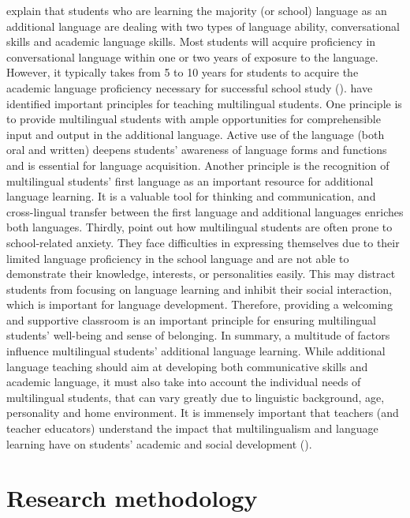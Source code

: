 \documentclass[output=paper]{langscibook}
\begin{document}
\citet{CumminsEarly2015} explain that students who are learning the majority (or school) language as an additional language are dealing with two types of language ability, conversational skills and academic language skills. Most students will acquire proficiency in conversational language within one or two years of exposure to the language. However, it typically takes from 5 to 10 years for students to acquire the academic language proficiency necessary for successful school study (\citealt{Wong_fillmore2000-2}). \citet{Lucas2008-3} have identified important principles for teaching multilingual students. One principle is to provide multilingual students with ample opportunities for comprehensible input and output in the additional language. Active use of the language (both oral and written) deepens students’ awareness of language forms and functions and is essential for language acquisition. Another principle is the recognition of multilingual students’ first language as an important resource for additional language learning. It is a valuable tool for thinking and communication, and cross-lingual transfer between the first language and additional languages enriches both languages. Thirdly, \citeauthor{Lucas2008-3} point out how multilingual students are often prone to school-related anxiety. They face difficulties in expressing themselves due to their limited language proficiency in the school language and are not able to demonstrate their knowledge, interests, or personalities easily. This may distract students from focusing on language learning and inhibit their social interaction, which is important for language development. Therefore, providing a welcoming and supportive classroom is an important principle for ensuring multilingual students’ well-being and sense of belonging.  In summary, a multitude of factors influence multilingual students’ additional language learning. While additional language teaching should aim at developing both communicative skills and academic language, it must also take into account the individual needs of multilingual students, that can vary greatly due to linguistic background, age, personality and home environment. It is immensely important that teachers (and teacher educators) understand the impact that multilingualism and language learning have on students’ academic and social development (\citealt{FlocktonCunningham2021,PaulsrudEtAl2023}).

\section{Research methodology}
\end{document}
